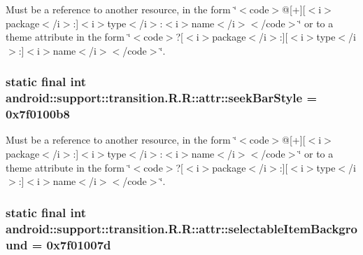 Must be a reference to another resource, in the form \char`\"{}$<$code$>$@\mbox{[}+\mbox{]}\mbox{[}$<$i$>$package$<$/i$>$:\mbox{]}$<$i$>$type$<$/i$>$:$<$i$>$name$<$/i$>$$<$/code$>$\char`\"{} or to a theme attribute in the form \char`\"{}$<$code$>$?\mbox{[}$<$i$>$package$<$/i$>$:\mbox{]}\mbox{[}$<$i$>$type$<$/i$>$:\mbox{]}$<$i$>$name$<$/i$>$$<$/code$>$\char`\"{}. \hypertarget{classandroid_1_1support_1_1transition_1_1_r_1_1attr_0df4d41e8186df69870e5b593309902e}{
\subsubsection[{seekBarStyle}]{\setlength{\rightskip}{0pt plus 5cm}static final int android::support::transition.R.R::attr::seekBarStyle = 0x7f0100b8}}
\label{classandroid_1_1support_1_1transition_1_1_r_1_1attr_0df4d41e8186df69870e5b593309902e}


Must be a reference to another resource, in the form \char`\"{}$<$code$>$@\mbox{[}+\mbox{]}\mbox{[}$<$i$>$package$<$/i$>$:\mbox{]}$<$i$>$type$<$/i$>$:$<$i$>$name$<$/i$>$$<$/code$>$\char`\"{} or to a theme attribute in the form \char`\"{}$<$code$>$?\mbox{[}$<$i$>$package$<$/i$>$:\mbox{]}\mbox{[}$<$i$>$type$<$/i$>$:\mbox{]}$<$i$>$name$<$/i$>$$<$/code$>$\char`\"{}. \hypertarget{classandroid_1_1support_1_1transition_1_1_r_1_1attr_8e832ee33594a47d054b33973414149e}{
\subsubsection[{selectableItemBackground}]{\setlength{\rightskip}{0pt plus 5cm}static final int android::support::transition.R.R::attr::selectableItemBackground = 0x7f01007d}}
\label{classandroid_1_1support_1_1transition_1_1_r_1_1attr_8e832ee33594a47d054b33973414149e}


